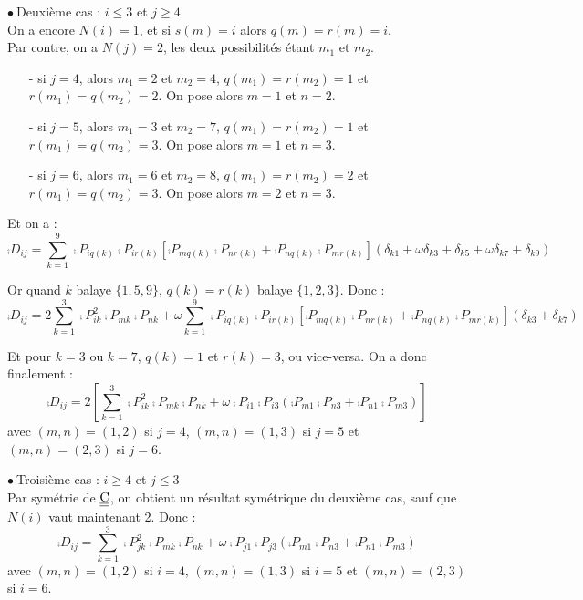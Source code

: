 \vspace{1cm}
$\bullet\ ${\sc Deuxi\`eme cas} : $i\leqslant 3$ et $j\geqslant 4$\\
On a encore $N(i)=1$, et si $s(m)=i$ alors $q(m)=r(m)=i$.\\
Par contre, on a $N(j)=2$, les deux possibilit\'es \'etant $m_1$ et $m_2$.\\
\begin{itemize}
\item[-] si $j=4$, alors $m_1=2$ et $m_2=4$,
$q(m_1)=r(m_2)=1$ et $r(m_1)=q(m_2)=2$. On pose alors
$m=1$ et $n=2$.

\item[-] si $j=5$, alors $m_1=3$ et $m_2=7$,
$q(m_1)=r(m_2)=1$ et $r(m_1)=q(m_2)=3$. On pose alors
$m=1$ et $n=3$.

\item[-] si $j=6$, alors $m_1=6$ et $m_2=8$,
$q(m_1)=r(m_2)=2$ et $r(m_1)=q(m_2)=3$. On pose alors
$m=2$ et $n=3$.
\end{itemize}

Et on a :
\begin{equation}
\comp{D}_{ij}=\sum_{k=1}^9
\comp{P}_{iq(k)}\comp{P}_{ir(k)}\left[
\comp{P}_{mq(k)}\comp{P}_{nr(k)}+\comp{P}_{nq(k)}\comp{P}_{mr(k)}\right]
(\delta_{k1}+\omega\delta_{k3}+\delta_{k5}+\omega\delta_{k7}+\delta_{k9})
\end{equation}

Or quand $k$ balaye $\{1,5,9\}$, $q(k)=r(k)$ balaye $\{1,2,3\}$. Donc :
\begin{equation}
\comp{D}_{ij}=2\sum_{k=1}^3
\comp{P}_{ik}^2\comp{P}_{mk}\comp{P}_{nk}
+\omega\sum_{k=1}^9
\comp{P}_{iq(k)}\comp{P}_{ir(k)}\left[
\comp{P}_{mq(k)}\comp{P}_{nr(k)}+\comp{P}_{nq(k)}\comp{P}_{mr(k)}\right]
(\delta_{k3}+\delta_{k7})
\end{equation}

Et pour $k=3$ ou $k=7$, $q(k)=1$ et $r(k)=3$, ou vice-versa. On a donc
finalement :
\begin{equation}
\comp{D}_{ij}=2\left[\sum_{k=1}^3
\comp{P}_{ik}^2\comp{P}_{mk}\comp{P}_{nk}
+\omega\comp{P}_{i1}\comp{P}_{i3}\left(
\comp{P}_{m1}\comp{P}_{n3}+\comp{P}_{n1}\comp{P}_{m3}\right)
\right]
\end{equation}
avec $(m,n)=(1,2)$ si $j=4$, $(m,n)=(1,3)$ si $j=5$ et $(m,n)=(2,3)$ si
$j=6$. 

\vspace{1cm}
$\bullet\ ${\sc Troisi\`eme cas} : $i\geqslant 4$ et $j\leqslant 3$\\
Par sym\'etrie de $\underline{\underline{\textrm{C}}}$, on obtient un r\'esultat sym\'etrique du
deuxi\`eme cas, sauf que $N(i)$ vaut maintenant 2. Donc :
\begin{equation}
\comp{D}_{ij}=\sum_{k=1}^3
\comp{P}_{jk}^2\comp{P}_{mk}\comp{P}_{nk}
+\omega\comp{P}_{j1}\comp{P}_{j3}\left(
\comp{P}_{m1}\comp{P}_{n3}+\comp{P}_{n1}\comp{P}_{m3}\right)
\end{equation}
avec $(m,n)=(1,2)$ si $i=4$, $(m,n)=(1,3)$ si $i=5$ et $(m,n)=(2,3)$ si
$i=6$. 

